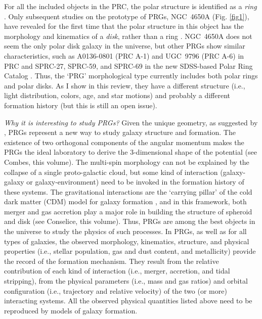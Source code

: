 \documentclass[11pt,twoside]{article}
\begin{document}
For all the included objects in the PRC, the polar structure is
identified as a {\it ring\/} \citet{Whitmore1990}. Only subsequent
studies on the prototype of PRGs, NGC~4650A (Fig. \ref{fig1}), have
revealed for the first time that the polar structure in this object
has the morphology and kinematics of a {\it disk\/}, rather than a ring
\citep[see][]{Arnaboldi1997, Iodice02, Gallagher2002, Swaters2003}. 
NGC~4650A does not seem the only polar disk galaxy in the universe,
but other PRGs show similar characteristics, such as A0136-0801 (PRC
A-1) and UGC~9796 (PRC A-6) in PRC and SPRC-27, SPRC-59, and SPRC-69
in the new SDSS-based Polar Ring Catalog \citep[SPRC;][]{Moiseev2011}.
Thus, the `PRG' morphological type currently includes both polar rings
and polar disks. As I show in this review, they have a different
structure (i.e., light distribution, colors, age, and star motions)
and probably a different formation history (but this is still an open
issue).

{\it Why it is interesting to study PRGs?\/} Given the unique
geometry, as suggested by \citet{Whitmore1990}, PRGs represent a new
way to study galaxy structure and formation. The existence of two
orthogonal components of the angular momentum makes the PRGs the ideal
laboratory to derive the 3-dimensional shape of the potential (see
Combes, this volume).  The multi-spin morphology can not be explained
by the collapse of a single proto-galactic cloud, but some kind of
interaction (galaxy-galaxy or galaxy-environment) need to be invoked
in the formation history of these systems.  The gravitational
interactions are the `carrying pillar' of the cold dark matter (CDM)
model for galaxy formation \citep[e.g.,][]{Col00}, and in this
framework, both merger and gas accretion play a major role in building
the structure of spheroid and disk (see Conselice, this volume).
Thus, PRGs are among the best objects in the universe to study the
physics of such processes.  In PRGs, as well as for all types of
galaxies, the observed morphology, kinematics, structure, and physical
properties (i.e., stellar population, gas and dust content, and
metallicity) provide the record of the formation mechanism. They
result from the relative contribution of each kind of interaction
(i.e., merger, accretion, and tidal stripping), from the physical
parameters (i.e., mass and gas ratios) and orbital configuration
(i.e., trajectory and relative velocity) of the two (or more)
interacting systems.  All the observed physical quantities listed
above need to be reproduced by models of galaxy formation.
\end{document}
